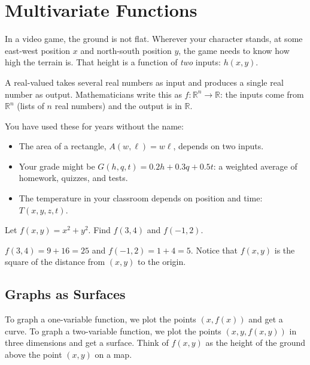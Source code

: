 \chapter{Multivariate Functions}

In a video game, the ground is not flat. Wherever your character stands,
at some east-west position $x$ and north-south position $y$, the game
needs to know how high the terrain is. That height is a function of
\emph{two} inputs: $h(x, y)$.

A real-valued  takes several real numbers as
input and produces a single real number as output. Mathematicians write
this as $f: \mathbb{R}^n \rightarrow \mathbb{R}$: the inputs come from
$\mathbb{R}^n$ (lists of $n$ real numbers) and the output is in
$\mathbb{R}$.

You have used these for years without the name:
\begin{itemize}
\item The area of a rectangle, $A(w, \ell) = w\ell$, depends on two inputs.
\item Your grade might be $G(h, q, t) = 0.2h + 0.3q + 0.5t$: a weighted
average of homework, quizzes, and tests.
\item The temperature in your classroom depends on position and time:
$T(x, y, z, t)$.
\end{itemize}

\begin{Worked}
\begin{Problem}
Let $f(x, y) = x^2 + y^2$. Find $f(3, 4)$ and
$f(-1, 2)$.
\end{Problem}
\begin{Solution}
$f(3, 4) = 9 + 16 = 25$ and $f(-1, 2) = 1 + 4 = 5$.
Notice that $f(x, y)$ is the square of the distance from $(x, y)$ to the
origin.
\end{Solution}
\end{Worked}

\section{Graphs as Surfaces}

To graph a one-variable function, we plot the points $(x, f(x))$ and get a
curve. To graph a two-variable function, we plot the points $(x, y, f(x,
y))$ in three dimensions and get a surface. Think of $f(x, y)$ as the
height of the ground above the point $(x, y)$ on a map.

